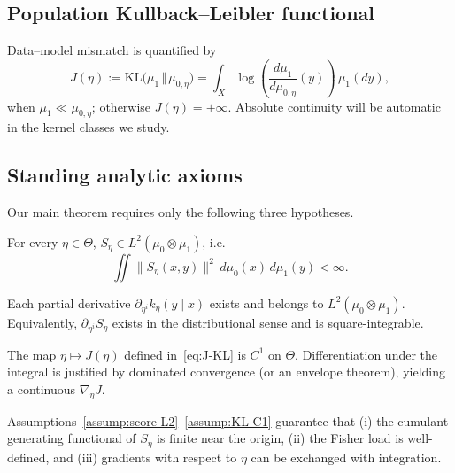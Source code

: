 \subsection{Population Kullback--Leibler functional}
\label{subsec:KL}

Data--model mismatch is quantified by
\begin{equation}
    J(\eta)
     := \mathrm{KL}\big(\mu_1\,\Vert\,\mu_{0,\eta}\big)
     = \int_X \log\!\left(\frac{d\mu_1}{d\mu_{0,\eta}}(y)\right)\,\mu_1(dy),
     \label{eq:J-KL}
\end{equation}
when $\mu_1\ll \mu_{0,\eta}$; otherwise $J(\eta)=+\infty$.  Absolute continuity will be automatic in the kernel classes we study.

\subsection{Standing analytic axioms}
\label{subsec:axioms}

Our main theorem requires only the following three hypotheses.

\begin{assumption}
\label{assump:score-L2}
For every $\eta\in\Theta$, $S_\eta\in L^2(\mu_0\otimes\mu_1)$, i.e.
\[
    \iint \|S_\eta(x,y)\|^2\,d\mu_0(x)\,d\mu_1(y) < \infty.
\]
\end{assumption}

\begin{assumption}
\label{assump:param-reg}
Each partial derivative $\partial_{\eta^i}k_\eta(y\mid x)$ exists and belongs to $L^2(\mu_0\otimes\mu_1)$.  Equivalently, $\partial_{\eta^i}S_\eta$ exists in the distributional sense and is square-integrable.
\end{assumption}

\begin{assumption}
\label{assump:KL-C1}
The map $\eta\mapsto J(\eta)$ defined in~\eqref{eq:J-KL} is $C^1$ on $\Theta$.  Differentiation under the integral is justified by dominated convergence (or an envelope theorem), yielding a continuous $\nabla_\eta J$.
\end{assumption}

Assumptions~\ref{assump:score-L2}--\ref{assump:KL-C1} guarantee that (i) the cumulant generating functional of $S_\eta$ is finite near the origin, (ii) the Fisher load is well-defined, and (iii) gradients with respect to $\eta$ can be exchanged with integration. 


